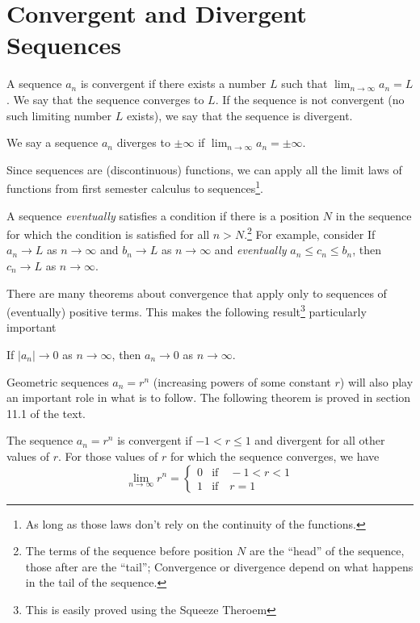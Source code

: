 \documentclass[12pt,letterpaper,fleqn]{article}
\theoremstyle{definition}
\begin{document}
\section*{Convergent and Divergent Sequences}
A sequence $a_n$ is convergent if there exists a number $L$ such that $\lim_{n\to\infty} a_n = L$. We say that the sequence converges to $L$. If the sequence is not convergent (no such limiting number $L$ exists), we say that the sequence is divergent.

We say a sequence $a_n$ diverges to $\pm\infty$ if $\lim_{n\to\infty} a_n = \pm\infty$.

Since sequences are (discontinuous) functions, we can apply all the limit laws of functions from first semester calculus to sequences\footnote{As long as those laws don't rely on the continuity of the functions.}.

A sequence \emph{eventually} satisfies a condition if there is a position $N$ in the sequence for which the condition is satisfied for all $n > N$.\footnote{The terms of the sequence before position $N$ are the ``head'' of the sequence, those after are the ``tail''; Convergence or divergence depend on what happens in the tail of the sequence.} For example, consider
  If $a_n\to L$ as $n\to\infty$ and $b_n\to L$ as $n\to\infty$ and \emph{eventually} $a_n\leq c_n\leq b_n$, then $c_n\to L$ as $n\to\infty$.

There are many theorems about convergence that apply only to sequences of (eventually) positive terms. This makes the following result\footnote{This is easily proved using the Squeeze Theroem} particularly important

\theorem If $|a_n|\to 0$ as $n\to\infty$, then $a_n\to 0$ as $n\to\infty$.

Geometric sequences $a_n = r^n$ (increasing powers of some constant $r$) will also play an important role in what is to follow. The following theorem is proved in section 11.1 of the text.

 The sequence $a_n = r^n$ is convergent if $-1 < r\leq 1$ and divergent for all other values of $r$. For those values of $r$ for which the sequence converges, we have
  \begin{equation*}
    \lim_{n\to\infty} r^n = \begin{cases}
      0 &\text{if}\quad -1 < r < 1\\
      1 &\text{if}\quad r = 1
  \end{cases}
  \end{equation*}
\end{document}
